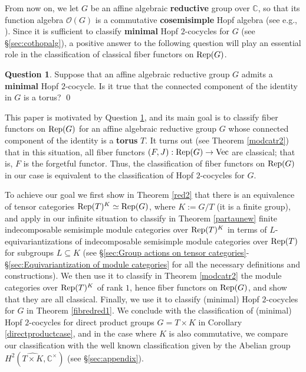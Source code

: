 \documentclass{amsart}
\theoremstyle{definition}
\newtheorem{question}[theorem]{Question}
\newcommand{\Rep}{{\rm Rep}}
\newcommand{\Vect}{{\rm Vec}}
\numberwithin{equation}{section}
\begin{document}
From now on, we let $G$ be an affine algebraic {\bf reductive} group over $\mathbb{C}$, so that its function algebra $\mathscr{O}(G)$ is a commutative {\bf cosemisimple} Hopf algebra (see e.g., \cite{A,M,S}). Since it is sufficient to classify {\bf minimal} Hopf $2$-cocycles for $G$ (see \S\ref{sec:cothopalg}), a positive answer to the following question will play an essential role in the classification of classical fiber functors on $\Rep(G)$.

\begin{question}{\rm \cite[Question 7.2]{EG1}}\label{redtor}
Suppose that an affine algebraic reductive  group $G$ admits a {\bf minimal} Hopf $2$-cocycle. Is it true that the connected component of the identity in $G$ is a torus? \qed
\end{question}

This paper is motivated by Question \ref{redtor}, and its main goal is to classify fiber functors on $\Rep(G)$ for an affine algebraic reductive group $G$ whose connected component of the identity is a {\bf torus} $T$. It turns out (see Theorem \ref{modcatr2}) that in this situation, all fiber functors $(F,J):\Rep(G)\to\Vect$ are classical; that is, $F$ is the forgetful functor. Thus, the classification of fiber functors on $\Rep(G)$ in our case is equivalent to the classification of Hopf $2$-cocycles for $G$.

To achieve our goal we first show in Theorem \ref{red2}
that there is an equivalence of tensor categories $\Rep(T)^K\simeq \Rep(G)$, where $K:=G/T$ (it is a finite group), and apply \cite[Proposition 5.4]{ENO} in our infinite situation to classify in Theorem \ref{partaunew} finite indecomposable semisimple module categories over $\Rep(T)^K$ in terms of $L$-equivariantizations of indecomposable semisimple module categories over ${\rm Rep}(T)$ for subgroups $L\subseteq K$ (see \S\ref{sec:Group actions on tensor categories}-\S\ref{sec:Equivariantization of module categories} for all the necessary definitions and constructions). We then use it to classify in Theorem \ref{modcatr2} the module categories over $\Rep(T)^K$ of rank $1$, hence fiber functors on $\Rep(G)$, and show that they are all classical. Finally, we use it to classify (minimal) Hopf $2$-cocycles for $G$ in Theorem \ref{fibredred1}. We conclude with the classification of (minimal) Hopf $2$-cocycles for direct product groups $G=T\times K$ in Corollary \ref{directproductcase}, and in the case where $K$ is also commutative, we compare our classification with the well known classification given by the Abelian group $H^2(\widehat{T\times K},\mathbb{C}^{\times})$ (see \S\ref{sec:appendix}).\\
\end{document}
